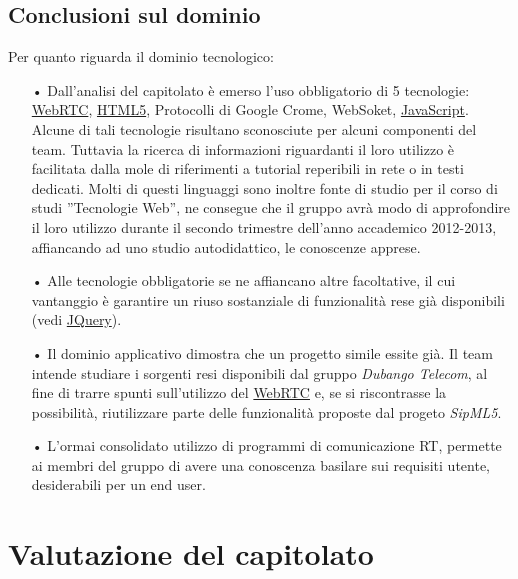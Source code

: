 \subsection{Conclusioni sul dominio}
Per quanto riguarda il dominio tecnologico:
\begin{itemize}
	\item[•] Dall'analisi del capitolato è emerso l'uso obbligatorio di 5 tecnologie: \underline{WebRTC}, \underline{HTML5}, Protocolli di Google Crome, WebSoket, \underline{JavaScript}. Alcune di tali tecnologie risultano sconosciute per alcuni componenti del team. Tuttavia la ricerca di informazioni riguardanti il loro utilizzo è facilitata dalla mole di riferimenti a tutorial reperibili in rete o in testi dedicati. Molti di questi linguaggi sono inoltre fonte di studio per il corso di studi ''Tecnologie Web'', ne consegue che il gruppo avrà modo di approfondire il loro utilizzo durante il secondo trimestre dell'anno accademico 2012-2013, affiancando ad uno studio autodidattico, le conoscenze apprese.
	\item[•] Alle tecnologie obbligatorie se ne affiancano altre facoltative, il cui vantanggio è garantire un riuso sostanziale di funzionalità rese già disponibili (vedi \underline{JQuery}).
	\item[•] Il dominio applicativo dimostra che un progetto simile essite già. Il team intende studiare i sorgenti resi disponibili dal gruppo \textit{Dubango Telecom}, al fine di trarre spunti sull'utilizzo del \underline{WebRTC} e, se si riscontrasse la possibilità, riutilizzare parte delle funzionalità proposte dal progeto \textit{SipML5}.
	\item[•] L'ormai consolidato utilizzo di programmi di comunicazione RT, permette ai membri del gruppo di avere una conoscenza basilare sui requisiti utente, desiderabili per un end user.
\end{itemize}

\section{Valutazione del capitolato}

